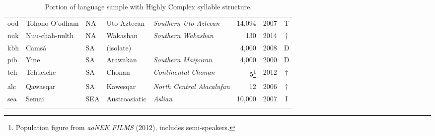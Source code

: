 \begin{table}
\begin{tabularx}{\textwidth}{lQlQQrlc}
 ood & {{Tohono O’odham}} &  NA & {Uto-Aztecan} & {\textit{Southern Uto-Aztecan}} &  14,094 & 2007 & T\\
 nuk & {{Nuu-chah-nulth}} &  NA & {Wakashan} & {\textit{Southern Wakashan}} &  130 & 2014 & †\\
 kbh & {{Camsá}} &  SA & {(isolate)} &  &  4,000 & 2008 & D\\
 pib & {{Yine}} &  SA & {Arawakan} & {\textit{Southern Maipuran}} &  4,000 & 2000 & D\\
 teh & {{Tehuelche}} &  SA & {Chonan} & {\textit{Continental Chonan}} &  5\footnote{Population figure from \textit{aoNEK FILMS} (2012), includes semi-speakers.} & 2012 & †\\
 alc & {{Qawasqar}} &  SA & {Kawesqar} & {\textit{North Central Alacalufan}} &  12 & 2006 & †\\
 sea & {{Semai}} &  SEA  & {Austroasiatic} & {\textit{Aslian}} &  10,000 & 2007 & I\\
\lspbottomrule
\end{tabularx}
\caption{Portion of language sample with Highly Complex syllable structure.\label{tab:A.4}}
\end{table}
